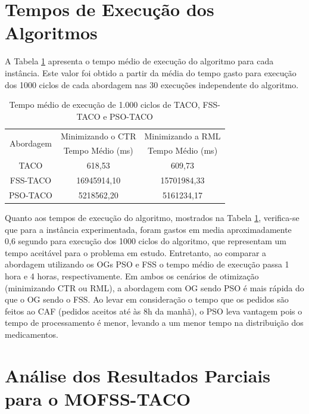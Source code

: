 \section{Tempos de Execução dos Algoritmos}
\label{sec-resultados-tempo}

A Tabela \ref{tab:resultado-tempo} apresenta o tempo médio de execução do algoritmo para cada instância. Este valor foi obtido a partir da média do tempo gasto para execução dos 1000 ciclos de cada abordagem nas 30 execuções independente do algoritmo.

\begin{table}[htb]
    \centering
    \caption{Tempo médio de execução de 1.000 ciclos de TACO, FSS-TACO e PSO-TACO} \label{tab:resultado-tempo}
    \begin{tabular}{|c|c|c|}
    \hline
    \multirow{2}{*}{Abordagem} & Minimizando o CTR & Minimizando a RML \\ \cline{2-3} 
                               & Tempo Médio (ms)  & Tempo Médio (ms)  \\ \hline
    TACO                       & 618,53            & 609,73            \\ \hline
    FSS-TACO                   & 16945914,10       & 15701984,33       \\ \hline
    PSO-TACO                   & 5218562,20        & 5161234,17        \\ \hline
    \end{tabular}
\end{table}

Quanto aos tempos de execução do algoritmo, mostrados na Tabela \ref{tab:resultado-tempo}, verifica-se que para a instância experimentada, foram gastos em media aproximadamente 0,6 segundo para execução dos 1000 ciclos do algoritmo, que representam um tempo aceitável para o problema em estudo. Entretanto, ao comparar a abordagem utilizando os OGs PSO e FSS o tempo médio de execução passa 1 hora e 4 horas, respectivamente. Em ambos os cenários de otimização (minimizando CTR ou RML), a abordagem com OG sendo PSO é mais rápida do que o OG sendo o FSS. Ao levar em consideração o tempo que os pedidos são feitos ao CAF (pedidos aceitos até às 8h da manhã), o PSO leva vantagem pois o tempo de processamento é menor, levando a um menor tempo na distribuição dos medicamentos.

\section{Análise dos Resultados Parciais para o MOFSS-TACO}
\label{sec-resultados-tempo}

